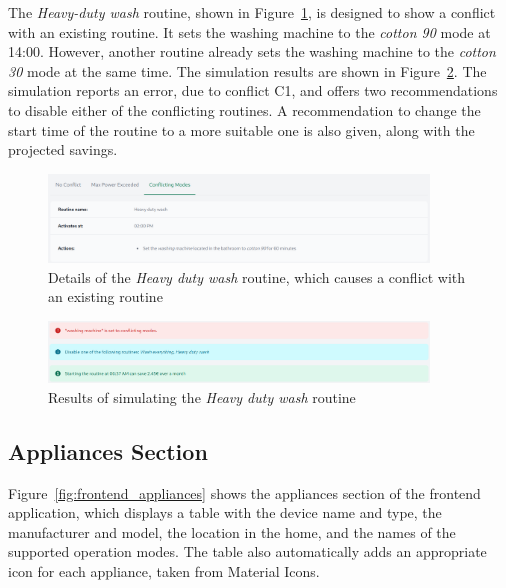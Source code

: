 The \textit{Heavy-duty wash} routine, shown in Figure~\ref{fig:frontend_conflicting_modes}, is designed to show a conflict with an existing routine. It sets the washing machine to the \textit{cotton 90} mode at 14:00. However, another routine already sets the washing machine to the \textit{cotton 30} mode at the same time. The simulation results are shown in Figure~\ref{fig:frontend_conflicting_modes_result}. The simulation reports an error, due to conflict C1, and offers two recommendations to disable either of the conflicting routines. A recommendation to change the start time of the routine to a more suitable one is also given, along with the projected savings.

\begin{figure}
    \centering
    \includegraphics[width=0.9\textwidth]{images/frontend/conflicting_modes.png}
    \caption{Details of the \textit{Heavy duty wash} routine, which causes a conflict with an existing routine}%
    \label{fig:frontend_conflicting_modes}
\end{figure}

\begin{figure}
    \centering
    \includegraphics[width=0.9\textwidth]{images/frontend/conflicting_modes_result.png}
    \caption{Results of simulating the \textit{Heavy duty wash} routine}%
    \label{fig:frontend_conflicting_modes_result}
\end{figure}

\subsection{Appliances Section}

Figure~\ref{fig:frontend_appliances} shows the appliances section of the frontend application, which displays a table with the device name and type, the manufacturer and model, the location in the home, and the names of the supported operation modes. The table also automatically adds an appropriate icon for each appliance, taken from Material Icons.

